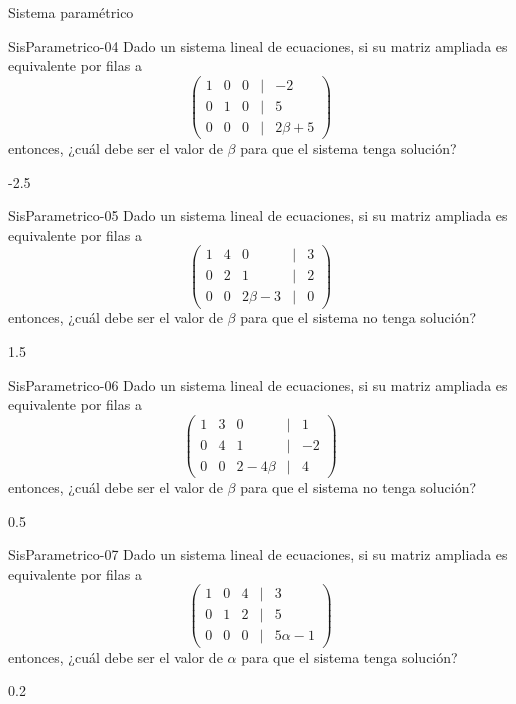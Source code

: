 \documentclass[a4,11pt]{aleph-notas}
\begin{document}
\begin{quiz}{Sistema paramétrico}
\begin{numerical}[tolerance=0.01]%
    {SisParametrico-04}
    Dado un sistema lineal de ecuaciones, si su matriz ampliada es equivalente por filas a 
    \[
    \begin{pmatrix}
    1 & 0 & 0 & | & -2 \\
    0 & 1 & 0 & | & 5 \\
    0 & 0 & 0 & | & 2\beta+5
    \end{pmatrix}
    \]
    entonces, ¿cuál debe ser el valor de $\beta$ para que el sistema tenga solución?
    \item -2.5
\end{numerical}

\begin{numerical}[tolerance=0.01]%
    {SisParametrico-05}
    Dado un sistema lineal de ecuaciones, si su matriz ampliada es equivalente por filas a 
    \[
    \begin{pmatrix}
    1 & 4 & 0 & | & 3 \\
    0 & 2 & 1 & | & 2 \\
    0 & 0 & 2\beta-3 & | & 0
    \end{pmatrix}
    \]
    entonces, ¿cuál debe ser el valor de $\beta$ para que el sistema no tenga solución?
    \item 1.5
\end{numerical}

\begin{numerical}[tolerance=0.01]%
    {SisParametrico-06}
    Dado un sistema lineal de ecuaciones, si su matriz ampliada es equivalente por filas a 
    \[
    \begin{pmatrix}
    1 & 3 & 0 & | & 1 \\
    0 & 4 & 1 & | & -2 \\
    0 & 0 & 2-4\beta & | & 4
    \end{pmatrix}
    \]
    entonces, ¿cuál debe ser el valor de $\beta$ para que el sistema no tenga solución?
    \item 0.5
\end{numerical}

\begin{numerical}[tolerance=0.01]%
    {SisParametrico-07}
    Dado un sistema lineal de ecuaciones, si su matriz ampliada es equivalente por filas a 
    \[
    \begin{pmatrix}
    1 & 0 & 4 & | & 3 \\
    0 & 1 & 2 & | & 5 \\
    0 & 0 & 0 & | & 5\alpha-1
    \end{pmatrix}
    \]
    entonces, ¿cuál debe ser el valor de $\alpha$ para que el sistema tenga solución?
    \item 0.2
\end{numerical}


\end{quiz}
\end{document}
